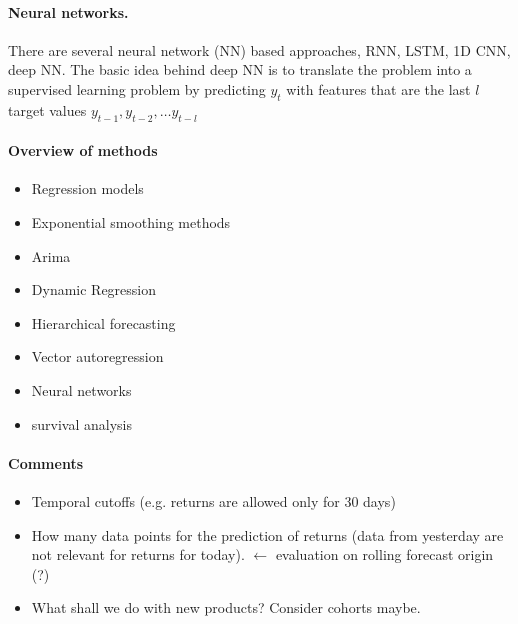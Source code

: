 \documentclass[12pt,a4paper]{article}
\begin{document}
\paragraph{Neural networks.} There are several neural network (NN) based approaches, RNN, LSTM, 1D CNN, deep NN. The basic idea behind deep NN is to translate the problem into a supervised learning problem by predicting $y_t$ with features that are the last $l$ target values $y_{t-1}, y_{t-2},\dots y_{t-l}$ 
\paragraph{Overview of methods} 
\begin{itemize}
	\item Regression models
	\item Exponential smoothing methods
	\item Arima
	\item Dynamic Regression 
	\item Hierarchical forecasting
	\item Vector autoregression
	\item Neural networks
	\item survival analysis
\end{itemize}

\paragraph{Comments}
\begin{itemize}
	\item Temporal cutoffs (e.g. returns are allowed only for 30 days)
	\item How many data points for the prediction of returns (data from yesterday are not relevant for returns for today). $\leftarrow$ evaluation on rolling forecast origin (?)
	\item What shall we do with new products? Consider cohorts maybe.
	
\end{itemize}




\end{document}
